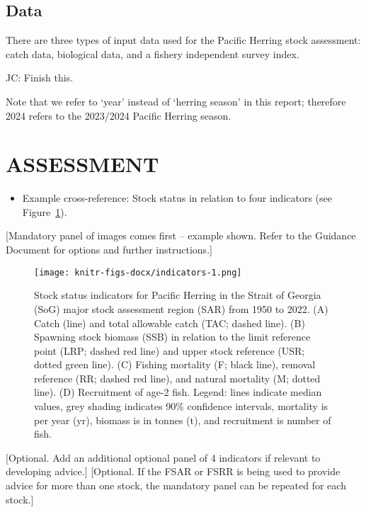 \documentclass[11pt]{book}
\begin{document}
\hypertarget{data}{%
\subsection*{Data}\label{data}}

There are three types of input data used for the Pacific Herring stock assessment: catch data, biological data, and a fishery independent survey index.

JC: Finish this.

Note that we refer to `year' instead of `herring season' in this report; therefore 2024 refers to the 2023/2024 Pacific Herring season.

\hypertarget{assessment}{%
\section*{ASSESSMENT}\label{assessment}}
\begin{itemize}

\item
  Example cross-reference: Stock status in relation to four indicators (see Figure~\ref{fig:indicators}).
\end{itemize}
{[}Mandatory panel of images comes first -- example shown. Refer to the Guidance Document for options and further instructions.{]}


\begin{figure}
\centering
\texttt{[image: knitr-figs-docx/indicators-1.png]}
\caption{\label{fig:indicators}Stock status indicators for Pacific Herring in the Strait of Georgia (SoG) major stock assessment region (SAR) from 1950 to 2022. (A) Catch (line) and total allowable catch (TAC; dashed line). (B) Spawning stock biomass (SSB) in relation to the limit reference point (LRP; dashed red line) and upper stock reference (USR; dotted green line). (C) Fishing mortality (F; black line), removal reference (RR; dashed red line), and natural mortality (M; dotted line). (D) Recruitment of age-2 fish. Legend: lines indicate median values, grey shading indicates 90\% confidence intervals, mortality is per year (yr), biomass is in tonnes (t), and recruitment is number of fish.}
\end{figure}
{[}Optional. Add an additional optional panel of 4 indicators if relevant to developing advice.{]} {[}Optional. If the FSAR or FSRR is being used to provide advice for more than one stock, the mandatory panel can be repeated for each stock.{]}
\end{document}
